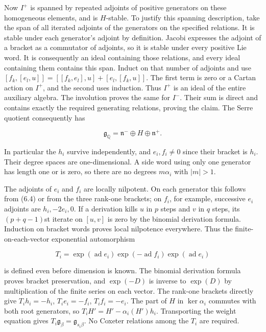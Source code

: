 \documentclass[11pt,a4paper,openany]{report}
\begin{document}
Now \(I^+\) is spanned by repeated adjoints of positive generators on these homogeneous elements, and is \(H\)-stable. To justify this spanning description, take the span of all iterated adjoints of the generators on the specified relations. It is stable under each generator's adjoint by definition. Jacobi expresses the adjoint of a bracket as a commutator of adjoints, so it is stable under every positive Lie word. It is consequently an ideal containing those relations, and every ideal containing them contains this span. Induct on that number of adjoints and use \([f_k,[e_l,u]]=[[f_k,e_l],u]+[e_l,[f_k,u]]\). The first term is zero or a Cartan action on \(I^+\), and the second uses induction. Thus \(I^+\) is an ideal of the entire auxiliary algebra. The involution proves the same for \(I^-\). Their sum is direct and contains exactly the required generating relations, proving the claim. The Serre quotient consequently has

\[
\mathfrak g_{\mathbb Q}=\mathfrak n^-\oplus H\oplus\mathfrak n^+.
\tag{6.6}
\]

In particular the \(h_i\) survive independently, and \(e_i,f_i\ne0\) since their bracket is \(h_i\). Their degree spaces are one-dimensional. A side word using only one generator has length one or is zero, so there are no degrees \(m\alpha_i\) with \(|m|>1\).

The adjoints of \(e_i\) and \(f_i\) are locally nilpotent. On each generator this follows from (6.4) or from the three rank-one brackets; on \(f_i\), for example, successive \(e_i\) adjoints are \(h_i,-2e_i,0\). If a derivation kills \(u\) in \(p\) steps and \(v\) in \(q\) steps, its \((p+q-1)\)st iterate on \([u,v]\) is zero by the binomial derivation formula. Induction on bracket words proves local nilpotence everywhere. Thus the finite-on-each-vector exponential automorphism

\[
T_i=\exp(\operatorname{ad}e_i)
\exp(-\operatorname{ad}f_i)
\exp(\operatorname{ad}e_i)
\tag{6.7}
\]

is defined even before dimension is known. The binomial derivation formula proves bracket preservation, and \(\exp(-D)\) is inverse to \(\exp(D)\) by multiplication of the finite series on each vector. The rank-one brackets directly give \(T_i h_i=-h_i\), \(T_i e_i=-f_i\), \(T_i f_i=-e_i\). The part of \(H\) in \(\ker\alpha_i\) commutes with both root generators, so \(T_i H'=H'-\alpha_i(H')h_i\). Transporting the weight equation gives \(T_i\mathfrak g_\beta=\mathfrak g_{s_i\beta}\). No Coxeter relations among the \(T_i\) are required.
\end{document}
